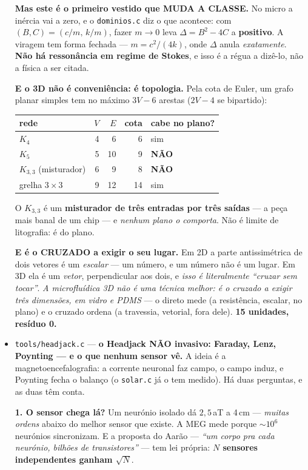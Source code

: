 \documentclass[11pt]{article}
\newcommand{\code}[1]{\texttt{\small #1}}
\theoremstyle{plain}
\theoremstyle{remark}
\begin{document}
\begin{itemize}
\textbf{Mas este é o primeiro vestido que MUDA A CLASSE.} No micro a inércia vai a zero, e o
\code{dominios.c} diz o que acontece: com $(B,C)=(c/m,\,k/m)$, fazer $m\to0$ leva $\Delta=B^2-4C$ a
\textbf{positivo}. A viragem tem forma fechada --- $m = c^2/(4k)$, onde $\Delta$ anula
\emph{exatamente}. \textbf{Não há ressonância em regime de Stokes}, e isso é a régua a dizê-lo, não
a física a ser citada.

\textbf{E o 3D não é conveniência: é topologia.} Pela cota de Euler, um grafo planar simples tem no
máximo $3V-6$ arestas ($2V-4$ se bipartido):

\begin{center}
\begin{tabular}{lrrrl}
\toprule
rede & $V$ & $E$ & cota & cabe no plano? \\
\midrule
$K_4$ & 4 & 6 & 6 & sim \\
$K_5$ & 5 & 10 & 9 & \textbf{NÃO} \\
$K_{3,3}$ (misturador) & 6 & 9 & 8 & \textbf{NÃO} \\
grelha $3\times3$ & 9 & 12 & 14 & sim \\
\bottomrule
\end{tabular}
\end{center}

O $K_{3,3}$ é um \textbf{misturador de três entradas por três saídas} --- a peça mais banal de um
chip --- e \emph{nenhum plano o comporta}. Não é limite de litografia: é do plano.

\textbf{E é o CRUZADO a exigir o seu lugar.} Em 2D a parte antissimétrica de dois vetores é um
\emph{escalar} --- um número, e um número não é um lugar. Em 3D ela é um \emph{vetor}, perpendicular
aos dois, e \emph{isso é literalmente ``cruzar sem tocar''}. \emph{A microfluídica 3D não é uma
técnica melhor: é o cruzado a exigir três dimensões, em vidro e PDMS} --- o direto mede (a
resistência, escalar, no plano) e o cruzado ordena (a travessia, vetorial, fora dele).
\textbf{15 unidades, resíduo 0.}


\item \code{tools/headjack.c} --- \textbf{o Headjack NÃO invasivo: Faraday, Lenz, Poynting --- e o
que nenhum sensor vê.} A ideia é a magnetoencefalografia: a corrente neuronal faz campo, o campo
induz, e Poynting fecha o balanço (o \code{solar.c} já o tem medido). Há duas perguntas, e as duas
têm conta.

\textbf{1. O sensor chega lá?} Um neurónio isolado dá $2{,}5$\,aT a 4\,cm --- \emph{muitas ordens}
abaixo do melhor sensor que existe. A MEG mede porque $\sim\!10^6$ neurónios sincronizam. E a
proposta do Aarão --- \emph{``um corpo pra cada neurónio, bilhões de transistores''} --- tem lei
própria: \textbf{$N$ sensores independentes ganham $\sqrt{N}$}.


\end{itemize}
\end{document}
